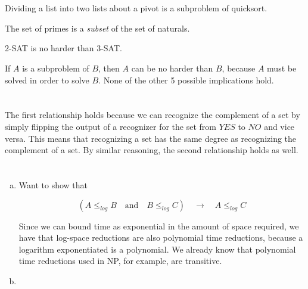 \documentclass{article}
\begin{document}
\section{}
Dividing a list into two lists about a pivot is a subproblem of quicksort.

The set of primes is a \emph{subset} of the set of naturals.

2-SAT is no harder than 3-SAT.

If $A$ is a subproblem of $B$, then $A$ can be no harder than $B$, because $A$
must be solved in order to solve $B$. None of the other 5 possible implications
hold. 

\section{}
The first relationship holds because we can recognize the complement of a set
by simply flipping the output of a recognizer for the set from $YES$ to $NO$
and vice versa. This means
that recognizing a set has the same degree as recognizing the complement of a
set. By similar reasoning, the second relationship holds as well.

\section{}
\begin{enumerate}[a)]
\item
Want to show that

\[
(A \le_{log} B \hspace{1em} \text{and} \hspace{1em} B \le_{log} C)
\hspace{1em} \rightarrow \hspace{1em} A \le_{log} C
\]

Since we can bound time as exponential in the amount of space required, we have
that log-space reductions are also polynomial time reductions, because a
logarithm exponentiated is a polynomial. We already know that polynomial time
reductions used in NP, for example, are transitive.

\item


\end{enumerate}
\section{}

\section{}
\end{document}
